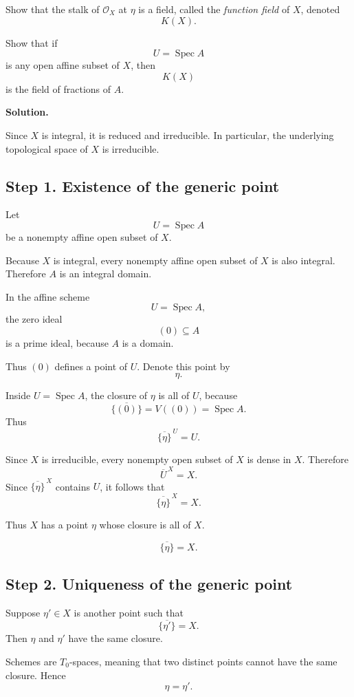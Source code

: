 \documentclass[12pt,a4paper]{article}
\theoremstyle{notespace}
\begin{document}
Show that the stalk of \(\mathcal{O}_X\) at \(\eta\) is a field, called the \emph{function field} of \(X\), denoted
\[
K(X).
\]

Show that if
\[
U=\operatorname{Spec}A
\]
is any open affine subset of \(X\), then
\[
K(X)
\]
is the field of fractions of \(A\).

\textbf{Solution.}

Since \(X\) is integral, it is reduced and irreducible. In particular, the underlying topological space of \(X\) is irreducible.

\subsection*{Step 1. Existence of the generic point}

Let
\[
U=\operatorname{Spec}A
\]
be a nonempty affine open subset of \(X\).

Because \(X\) is integral, every nonempty affine open subset of \(X\) is also integral. Therefore \(A\) is an integral domain.

In the affine scheme
\[
U=\operatorname{Spec}A,
\]
the zero ideal
\[
(0)\subseteq A
\]
is a prime ideal, because \(A\) is a domain.

Thus \((0)\) defines a point of \(U\). Denote this point by
\[
\eta.
\]

Inside \(U=\operatorname{Spec}A\), the closure of \(\eta\) is all of \(U\), because
\[
\overline{\{(0)\}}=V((0))=\operatorname{Spec}A.
\]
Thus
\[
\overline{\{\eta\}}^{\,U}=U.
\]

Since \(X\) is irreducible, every nonempty open subset of \(X\) is dense in \(X\). Therefore
\[
\overline{U}^{\,X}=X.
\]
Since \(\overline{\{\eta\}}^{\,X}\) contains \(U\), it follows that
\[
\overline{\{\eta\}}^{\,X}=X.
\]

Thus \(X\) has a point \(\eta\) whose closure is all of \(X\).

\[
\boxed{
	\overline{\{\eta\}}=X.
}
\]

\subsection*{Step 2. Uniqueness of the generic point}

Suppose \(\eta'\in X\) is another point such that
\[
\overline{\{\eta'\}}=X.
\]
Then \(\eta\) and \(\eta'\) have the same closure.

Schemes are \(T_0\)-spaces, meaning that two distinct points cannot have the same closure. Hence
\[
\eta=\eta'.
\]
\end{document}
